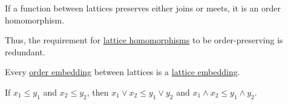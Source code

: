 \begin{proposition}
\begin{thmenum}
     If a function between lattices preserves either joins or meets, it is an order homomorphism.

    Thus, the requirement for \hyperref[def:lattice/homomorphism]{lattice homomorphisms} to be order-preserving is redundant.

     Every \hyperref[def:preordered_set/homomorphism]{order embedding} between lattices is a \hyperref[def:lattice/homomorphism]{lattice embedding}.

     If \( x_1 \leq y_1 \) and \( x_2 \leq y_2 \), then \( x_1 \vee x_2 \leq y_1 \vee y_2 \) and \( x_1 \wedge x_2 \leq y_1 \wedge y_2 \).
  \end{thmenum}
\end{proposition}
